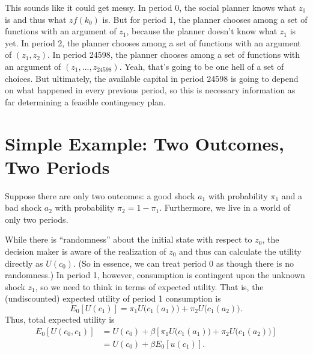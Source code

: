 \documentclass[12pt]{article}
\theoremstyle{definition}
\begin{document}
This sounds like it could get messy. In period 0, the social planner knows what $z_0$ is and thus what $zf(k_0)$ is. But for period 1, the planner chooses among a set of functions with an argument of $z_1$, because the planner doesn't know what $z_1$ is yet. In period 2, the planner chooses among a set of functions with an argument of $(z_1, z_2)$. In period 24598, the planner chooses among a set of functions with an argument of $(z_1, ..., z_{24598})$. Yeah, that's going to be one hell of a set of choices. But ultimately, the available capital in period 24598 is going to depend on what happened in every previous period, so this is necessary information as far determining a feasible contingency plan. 



\section{Simple Example: Two Outcomes, Two Periods}
Suppose there are only two outcomes: a good shock $a_1$ with probability $\pi_1$ and a bad shock $a_2$ with probability $\pi_2 = 1 - \pi_1$. Furthermore, we live in a world of only two periods. 

While there is ``randomness'' about the initial state with respect to $z_0$, the decision maker is aware of the realization of $z_0$ and thus can calculate the utility directly as $U(c_0)$. (So in essence, we can treat period 0 as though there is no randomness.) In period 1, however, consumption is contingent upon the unknown shock $z_1$, so we need to think in terms of expected utility. That is, the (undiscounted) expected utility of period 1 consumption is
	\[E_0[ U(c_1)]=\pi_1 U\big(c_1(a_1)\big) + \pi_2 U \big(c_1 (a_2)\big).	\]
Thus, total expected utility is
\begin{align*}
	E_0[ U(c_0, c_1)] &=U(c_0) + \beta \left [ \pi_1 U\big(c_1(a_1)\big) + \pi_2 U \big(c_1 (a_2)\big)	\right]\\
	& = U(c_0) + \beta E_0[ u(c_1)].
\end{align*}
\end{document}
